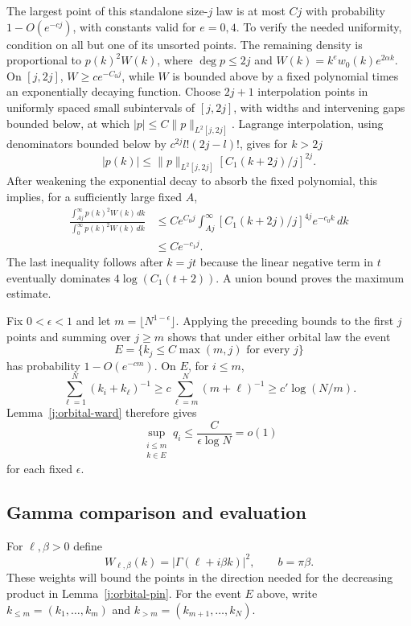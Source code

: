 The largest point of this standalone size-$j$ law is at most $Cj$ with
probability $1-O(e^{-cj})$, with constants valid for $e=0,4$. To verify
the needed uniformity, condition on all but one of its unsorted points.
The remaining density is proportional to $p(k)^2W(k)$, where
$\deg p\le2j$ and $W(k)=k^e w_0(k)e^{2\alpha k}$. On $[j,2j]$,
$W\ge c e^{-C_0j}$, while $W$ is bounded above by a fixed polynomial
times an exponentially decaying function. Choose $2j+1$ interpolation
points in uniformly spaced small subintervals of $[j,2j]$, with widths
and intervening gaps bounded below, at which
$|p|\le C\|p\|_{L^2[j,2j]}$. Lagrange interpolation, using denominators
bounded below by $c^{2j}l!(2j-l)!$, gives for $k>2j$
\[
 |p(k)|\le\|p\|_{L^2[j,2j]}
       [C_1(k+2j)/j]^{2j}.
\]
After weakening the exponential decay to absorb the fixed polynomial,
this implies, for a sufficiently large fixed $A$,
\[
 \begin{aligned}
 \frac{\int_{Aj}^\infty p(k)^2W(k)\,dk}
      {\int_0^\infty p(k)^2W(k)\,dk}
 &\le C e^{C_0j}\int_{Aj}^\infty
       [C_1(k+2j)/j]^{4j}e^{-c_0k}\,dk
 \\ &\le C e^{-c_1j}.
 \end{aligned}
\]
The last inequality follows after $k=jt$ because the linear negative
term in $t$ eventually dominates $4\log(C_1(t+2))$. A union bound proves
the maximum estimate.

Fix $0<\epsilon<1$ and let $m=\lfloor N^{1-\epsilon}\rfloor$. Applying
the preceding bounds to the first $j$ points and summing over $j\ge m$
shows that under either orbital law the event
\[
 E=\{k_j\le C\max(m,j)\text{ for every }j\}
\]
has probability $1-O(e^{-c m})$. On $E$, for $i\le m$,
\[
 \sum_{\ell=1}^N(k_i+k_\ell)^{-1}
 \ge c\sum_{\ell=m}^N(m+\ell)^{-1}
 \ge c'\log(N/m).
\]
Lemma~\ref{j:orbital-ward} therefore gives
\begin{equation}\label{j:boundary-small-orbit}
 \sup_{\substack{i\le m\\ k\in E}}q_i
 \le\frac{C}{\epsilon\log N}=o(1)
\end{equation}
for each fixed $\epsilon$.

\subsection{Gamma comparison and evaluation}

For $\ell,\beta>0$ define
\[
 W_{\ell,\beta}(k)=|\Gamma(\ell+i\beta k)|^2,\qquad b=\pi\beta.
\]
These weights will bound the points in the direction needed for the
decreasing product in Lemma~\ref{j:orbital-pin}. For the event $E$ above,
write $k_{\le m}=(k_1,\ldots,k_m)$ and
$k_{>m}=(k_{m+1},\ldots,k_N)$.

